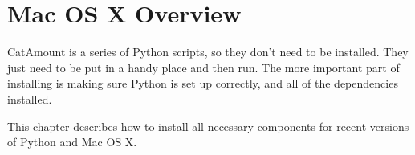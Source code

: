 \chapter{Mac OS X Overview}
\hypertarget{macosx-overview}{}

CatAmount is a series of Python scripts, so they don't need to be
installed. They just need to be put in a handy place and then run.
The more important part of installing is making sure Python is
set up correctly, and all of the dependencies installed.

This chapter describes how to install all necessary components
for recent versions of Python and Mac OS X.
